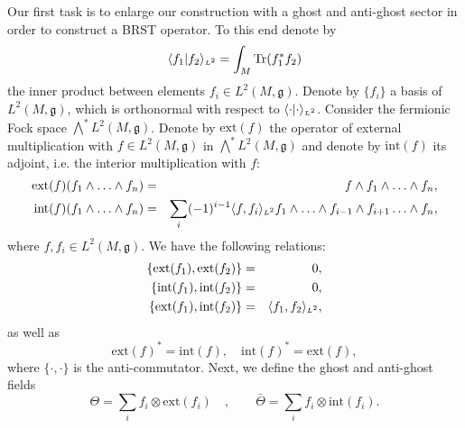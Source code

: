 \documentclass[letterpaper,12pt]{article}
\newcommand{\nn}{\nonumber}
\def\d{\delta}
\begin{document}
Our first task is to enlarge our construction with a ghost and anti-ghost sector in order to construct a BRST operator. To this end
denote by 
$$
\langle f_1 \vert f_2 \rangle_{\mbox{\tiny $L^2$}} = \int_M \mbox{Tr}(f_1^* f_2)
$$ the inner product between elements $f_i\in L^2(M,\mathfrak{g})$. Denote by $\{f_i\}$ a basis of $ L^2(M,\mathfrak{g})$, which is orthonormal with respect to $\langle \cdot \vert \cdot \rangle_{\mbox{\tiny $L^2$}}$. Consider the fermionic Fock space $\bigwedge^* L^2(M,\mathfrak{g})$. Denote by $\mbox{ext}(f)$ the operator of external multiplication with $f\in L^2(M,\mathfrak{g})$ in $\bigwedge^* L^2(M,\mathfrak{g})$ and 
denote by $\mbox{int}(f)$ its adjoint, i.e. the interior multiplication with $f$:
\begin{eqnarray}
\mbox{ext}(f) (f_1 \wedge  \ldots \wedge f_n) &=&  f\wedge f_1 \wedge  \ldots \wedge f_n,
\nn\\
\mbox{int} (f) (f_1 \wedge  \ldots \wedge f_n) &=& \sum_i (-1)^{i-1} \langle f, f_i \rangle_{\mbox{\tiny $L^2$}} f_1 \wedge \ldots \wedge f_{i-1} \wedge f_{i+1} \ldots \wedge f_n,
\nn
\end{eqnarray}
where $f, f_i\in L^2(M, \mathfrak{g})$. We have the following relations:
\begin{eqnarray}
\{\mbox{ext}(f_1), \mbox{ext}(f_2)  \} &=& 0,
\nn\\
\{\mbox{int}(f_1), \mbox{int}(f_2)  \} &=& 0,
\nn\\
\{\mbox{ext}(f_1), \mbox{int}(f_2)  \} &=& \langle f_1, f_2 \rangle_{\mbox{\tiny $L^2$}}  ,
\end{eqnarray}
as well as
$$
\mbox{ext}(f)^* = \mbox{int}(f),\quad \mbox{int}(f)^* = \mbox{ext}(f),
$$
where $\{\cdot,\cdot\}$ is the anti-commutator. 
Next, we define the ghost and anti-ghost fields
$$
\Theta = \sum_i f_i \otimes\mbox{ext}(f_i)\quad,\qquad \bar{\Theta} = \sum_i f_i \otimes \mbox{int}(f_i).
$$
\end{document}
